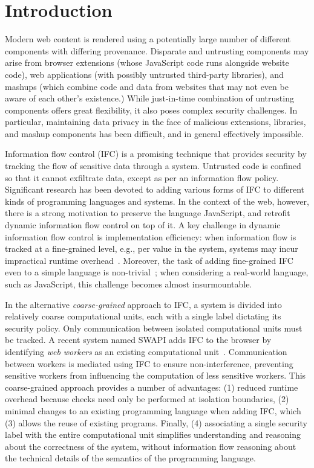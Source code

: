 \section{Introduction}
\label{sec:intro}

Modern web content is rendered using a potentially large number of
different components with differing provenance.
Disparate and untrusting components may arise from browser
extensions (whose JavaScript code runs alongside website
code), web applications (with possibly untrusted third-party
libraries), and mashups (which combine code and data from
websites that may not even be aware of each other's existence.)
While just-in-time combination of untrusting components
offers great flexibility, it also poses complex security challenges.
In particular, maintaining data privacy in the face of malicious
extensions, libraries, and mashup components has been difficult,
and in general effectively impossible.

Information flow control (IFC) is a promising technique
that provides security
by tracking the flow of sensitive data through a system.
Untrusted code is confined so that it cannot exfiltrate data, except as
per an information flow policy.  Significant research has been devoted to
adding various forms of IFC to different kinds of programming languages
and systems.  In the context of the web, however, there is a strong
motivation to preserve the language JavaScript, and retrofit dynamic information
flow control on top of it.  A key challenge in dynamic information
flow control is implementation efficiency: when
information flow is tracked at a fine-grained level,
e.g., per value in the system, systems may incur
impractical runtime overhead~\cite{JSFlow}.
%
Moreover, the task of adding fine-grained IFC even to a simple language is
non-trivial~\cite{hritcu2013testing}; when considering a real-world language,
such as JavaScript, this challenge becomes almost insurmountable.


In the alternative \textit{coarse-grained} approach to IFC,
a system is divided into relatively coarse computational units,
each with a single label dictating its security policy.
Only
communication between isolated computational units must be tracked.
A recent system named SWAPI adds IFC to the
browser by identifying \emph{web workers} as an existing computational
unit~\cite{swapi}.  Communication between workers is mediated using
IFC to ensure non-interference, preventing sensitive workers from
influencing the computation of less sensitive workers.
This coarse-grained approach provides a number of advantages:
(1) reduced runtime overhead because checks need only
be performed at isolation boundaries, (2) minimal changes to an
existing programming language when adding IFC, which (3) allows
the reuse of existing programs.  Finally, (4) associating
a single security label with the entire computational unit simplifies
understanding and reasoning about the correctness of the
system, without information flow reasoning about the
technical details of the semantics of the programming language.

